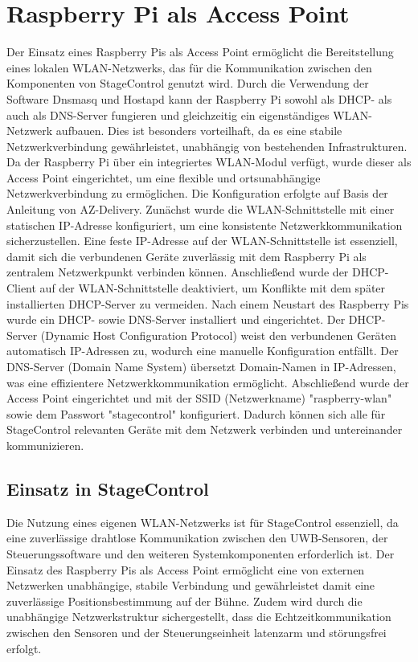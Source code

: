 \section{Raspberry Pi als Access Point} \label{RaspberryAccessPoint}
Der Einsatz eines Raspberry Pis als Access Point ermöglicht die Bereitstellung eines lokalen WLAN-Netzwerks, das für die Kommunikation zwischen den Komponenten von StageControl genutzt wird. Durch die Verwendung der Software Dnsmasq und Hostapd kann der Raspberry Pi sowohl als DHCP- als auch als DNS-Server fungieren und gleichzeitig ein eigenständiges WLAN-Netzwerk aufbauen. Dies ist besonders vorteilhaft, da es eine stabile Netzwerkverbindung gewährleistet, unabhängig von bestehenden Infrastrukturen.
Da der Raspberry Pi über ein integriertes WLAN-Modul verfügt, wurde dieser als Access Point eingerichtet, um eine flexible und ortsunabhängige Netzwerkverbindung zu ermöglichen. Die Konfiguration erfolgte auf Basis der Anleitung von AZ-Delivery.
Zunächst wurde die WLAN-Schnittstelle mit einer statischen IP-Adresse konfiguriert, um eine konsistente Netzwerkkommunikation sicherzustellen. Eine feste IP-Adresse auf der WLAN-Schnittstelle ist essenziell, damit sich die verbundenen Geräte zuverlässig mit dem Raspberry Pi als zentralem Netzwerkpunkt verbinden können. Anschließend wurde der DHCP-Client auf der WLAN-Schnittstelle deaktiviert, um Konflikte mit dem später installierten DHCP-Server zu vermeiden.
Nach einem Neustart des Raspberry Pis wurde ein DHCP- sowie DNS-Server installiert und eingerichtet. Der DHCP-Server (Dynamic Host Configuration Protocol) weist den verbundenen Geräten automatisch IP-Adressen zu, wodurch eine manuelle Konfiguration entfällt. Der DNS-Server (Domain Name System) übersetzt Domain-Namen in IP-Adressen, was eine effizientere Netzwerkkommunikation ermöglicht.
Abschließend wurde der Access Point eingerichtet und mit der SSID (Netzwerkname) "raspberry-wlan" sowie dem Passwort "stagecontrol" konfiguriert. Dadurch können sich alle für StageControl relevanten Geräte mit dem Netzwerk verbinden und untereinander kommunizieren. \parencite{RaspberryPiAccessPoint}

\newpage
\subsection{Einsatz in StageControl}
Die Nutzung eines eigenen WLAN-Netzwerks ist für StageControl essenziell, da eine zuverlässige drahtlose Kommunikation zwischen den UWB-Sensoren, der Steuerungssoftware und den weiteren Systemkomponenten erforderlich ist. Der Einsatz des Raspberry Pis als Access Point ermöglicht eine von externen Netzwerken unabhängige, stabile Verbindung und gewährleistet damit eine zuverlässige Positionsbestimmung auf der Bühne. Zudem wird durch die unabhängige Netzwerkstruktur sichergestellt, dass die Echtzeitkommunikation zwischen den Sensoren und der Steuerungseinheit latenzarm und störungsfrei erfolgt.

